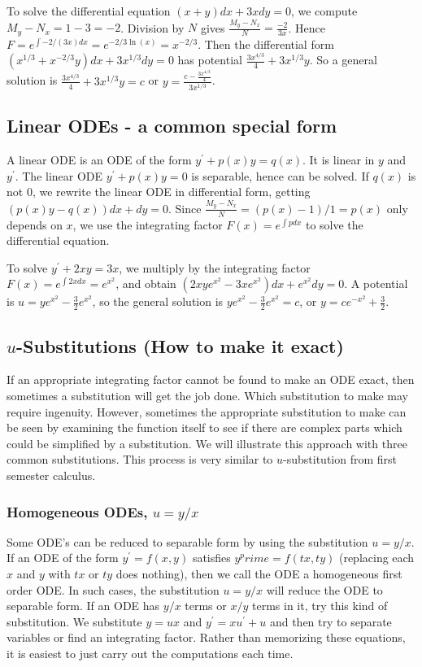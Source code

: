 \begin{example}
To solve the differential equation $(x+y)dx+3xdy=0$, we compute $M_y-N_x=1-3=-2$.  Division by $N$ gives $\frac{M_y-N_x}{N} = \frac{-2}{3x}$.  Hence $F=e^{\int -2/(3x) dx} = e^{-2/3 \ln(x)}=x^{-2/3}$. Then the differential form $(x^{1/3}+x^{-2/3}y)dx+3x^{1/3}dy=0$ has potential $\frac{3 x^{4/3}}{4}+3x^{1/3}y$.  So a general solution is $\frac{3 x^{4/3}}{4}+3x^{1/3}y=c$ or $y=\frac{c-\frac{3 x^{4/3}}{4}}{3x^{1/3}} $.
\end{example}

\subsection{Linear ODEs - a common special form}

A linear ODE is an ODE of the form $y^\prime+p(x)y=q(x)$. It is linear in $y$ and $y^\prime$. The linear ODE $y^\prime+p(x)y=0$ is separable, hence can be solved.  If $q(x)$ is not 0, we rewrite the linear ODE in differential form, getting $(p(x)y-q(x))dx+dy=0$. Since $\frac{M_y-N_x}{N} = (p(x)-1)/1=p(x)$ only depends on $x$, we use the integrating factor $F(x)=e^{\int p dx}$ to solve the differential equation. 

\begin{example}
To solve $y^\prime +2xy =3x$, we multiply by the integrating factor $F(x) = e^{\int 2x dx}= e^{x^2}$, and obtain $(2xye^{x^2}-3xe^{x^2})dx+e^{x^2}dy=0$. A potential is $u=ye^{x^2}-\frac32 e^{x^2}$, so the general solution is $ye^{x^2}-\frac32 e^{x^2}=c$, or $y=ce^{-x^2}+\frac32$. 
\end{example}

\subsection{$u$-Substitutions (How to make it exact)}
If an appropriate integrating factor cannot be found to make an ODE exact, then sometimes a substitution will get the job done.  Which substitution to make may require ingenuity.  However, sometimes the appropriate substitution to make can be seen by examining the function itself to see if there are complex parts which could be simplified by a substitution.  We will illustrate this approach with three common substitutions. This process is very similar to $u$-substitution from first semester calculus. 


\subsubsection{Homogeneous ODEs, $u=y/x$}
Some ODE's can be reduced to separable form by using the substitution $u=y/x$. If an ODE of the form $y^\prime = f(x,y)$ satisfies $y^prime=f(tx,ty)$ (replacing each $x$ and $y$ with $tx$ or $ty$ does nothing), then we call the ODE a homogeneous first order ODE. In such cases, the substitution $u=y/x$ will reduce the ODE to separable form. If an ODE has $y/x$ terms or $x/y$ terms in it, try this kind of substitution. We substitute $y=ux$ and $y^\prime = xu^\prime+u$ and then try to separate variables or find an integrating factor. Rather than memorizing these equations, it is easiest to just carry out the computations each time.

